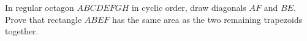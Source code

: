 In regular octagon $ABCDEFGH$ in cyclic order, draw diagonals $AF$ and $BE$. Prove that rectangle $ABEF$ has the same area as the two remaining trapezoids together.
